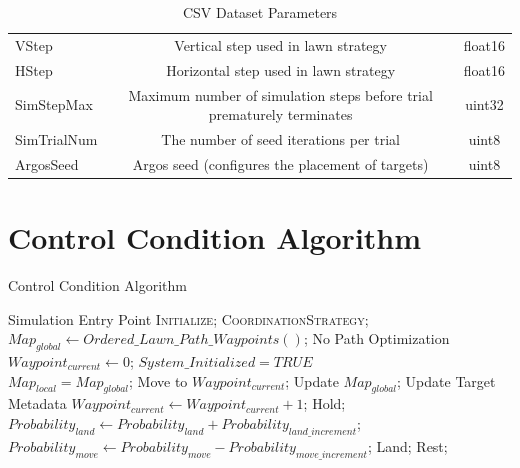 \documentclass{report}
\begin{document}
\begin{appendices}
\begin{table}
\begin{center}
\begin{tabular}{|l|c|c|}
		VStep & Vertical step used in lawn strategy & float16 \\
		HStep & Horizontal step used in lawn strategy & float16 \\
		SimStepMax & Maximum number of simulation steps before trial prematurely terminates & uint32 \\
		SimTrialNum & The number of seed iterations per trial & uint8 \\
		ArgosSeed  & Argos seed (configures the placement of targets) & uint8 \\
		\hline
		\end{tabular}
	\end{center}
	\caption{CSV Dataset Parameters}\label{tab:csv_params}
\end{table}
\restoregeometry
\chapter{Control Condition Algorithm}
\begin{algorithm}
	\caption{Control Condition Algorithm}
	\label{alg:con_algo}
	\begin{algorithmic}[1]
		 {} \Comment Simulation Entry Point
				\State \textsc{Initialize};
				\State \textsc{CoordinationStrategy};
			\EndWhile
		\EndProcedure
		\\
				\State $Map_{global} \gets Ordered\_Lawn\_Path\_Waypoints()$; \Comment No Path Optimization
				\State $Waypoint_{current} \gets 0$;
				\State $System\_Initialized = TRUE$
			\EndIf
		\EndProcedure
		\\
			\State $Map_{local} = Map_{global}$;
				\State Move to $Waypoint_{current}$;
						\State Update $Map_{global}$; \Comment Update Target Metadata
						\State $Waypoint_{current} \gets Waypoint_{current} + 1$;
					\Else
						\State Hold;
					\EndIf
					\State $Probability_{land} \gets Probability_{land} + Probability_{land\_increment}$;
					\State $Probability_{move} \gets Probability_{move} - Probability_{move\_increment}$;
				\EndIf
				\State Land;
			\Else
				\State Rest;
			\EndIf
		\EndProcedure
	\end{algorithmic}
\end{algorithm}

\end{appendices}
\end{document}
